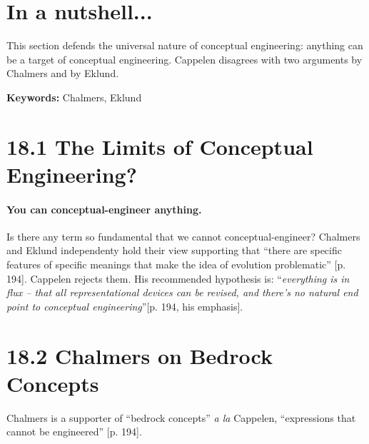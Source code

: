\documentclass[
10pt, %
a4paper, %
twocolumn, %
landscape %
]{article}
\begin{document}
\pagestyle{myheadings} %
\markright{\doctitle} %


\thispagestyle{plain} %

\printtitle %


\section*{In a nutshell... }
This section defends the universal nature of conceptual engineering: anything can be
a target of conceptual engineering.
Cappelen disagrees with two arguments by Chalmers and by Eklund.

\noindent \textbf{Keywords:} Chalmers, Eklund

\section*{18.1 The Limits of Conceptual Engineering?}
\paragraph{You can conceptual-engineer anything. }
Is there any term so fundamental that we cannot conceptual-engineer?
Chalmers and Eklund independenty hold their view supporting that
``there are specific features of specific meanings that make
the idea of evolution problematic'' [p. 194].
Cappelen rejects them.
His recommended hypothesis is: ``\emph{everything is in flux -- that all representational devices
can be revised, and there's no natural end point to conceptual engineering}''[p. 194, his emphasis].

\section*{18.2 Chalmers on Bedrock Concepts}
Chalmers is a supporter of ``bedrock concepts'' \textit{a la} Cappelen, ``expressions that cannot be engineered'' [p. 194].
\end{document}
